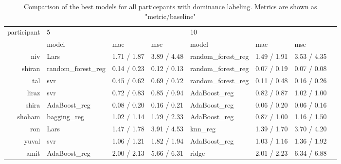 \documentclass[../main.tex]{subfiles}
\begin{document}
\begin{table}[!h]
    \begin{tabular}{rlllllll}
        \toprule
        participant &  \multicolumn{3}{l}{5} & \multicolumn{3}{l}{10} \\
              &               model & mae & mse &              model & mae & mse \\
        \midrule
             niv &               Lars &         1.71 / 1.87 &        3.89 / 4.48 &  random\_forest\_reg &         1.49 / 1.91 &        3.53 / 4.35 \\
          shiran &  random\_forest\_reg &         0.14 / 0.23 &        0.12 / 0.13 &  random\_forest\_reg &         0.07 / 0.19 &        0.07 / 0.08 \\
             tal &                svr &         0.45 / 0.62 &        0.69 / 0.72 &  random\_forest\_reg &         0.11 / 0.48 &        0.16 / 0.26 \\
           liraz &                svr &         0.72 / 0.83 &        0.85 / 0.94 &       AdaBoost\_reg &         0.82 / 0.87 &        1.02 / 1.00 \\
           shira &       AdaBoost\_reg &         0.08 / 0.20 &        0.16 / 0.21 &       AdaBoost\_reg &         0.06 / 0.20 &        0.06 / 0.16 \\
          shoham &        bagging\_reg &         1.02 / 1.14 &        1.79 / 2.33 &       AdaBoost\_reg &         0.87 / 1.00 &        1.16 / 1.50 \\
             ron &               Lars &         1.47 / 1.78 &        3.91 / 4.53 &            knn\_reg &         1.39 / 1.70 &        3.70 / 4.20 \\
           yuval &                svr &         1.06 / 1.21 &        1.82 / 1.94 &       AdaBoost\_reg &         1.03 / 1.16 &        1.36 / 1.92 \\
            amit &       AdaBoost\_reg &         2.00 / 2.13 &        5.66 / 6.31 &              ridge &         2.01 / 2.23 &        6.34 / 6.88 \\
        \bottomrule
    \end{tabular}
    \caption{Comparison of the best models for all particepants with dominance labeling. Metrics are shown as "metric/baseline"}  
\end{table}
\end{document}
